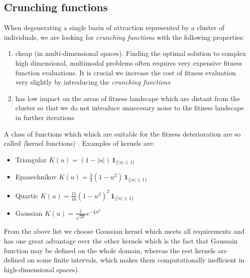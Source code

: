 \begin{algorithmic}[1]
	\ENDIF
\ENDWHILE
\end{algorithmic}

\subsection{Crunching functions}
When degenerating a single basin of attraction represented by a cluster of
individuals, we are looking for \textit{crunching functions} with the following
properties:

\begin{enumerate}
  \item cheap (in multi-dimensional spaces). Finding the optimal solution to
  complex high dimensional, multimodal problems often requires 
  very expensive fitness function evaluations. It is crucial we increase the
  cost of fitness evaluation very slightly by introducing the \textit{crunching
  functions}
  \item has low impact on the areas of fitness landscape which are distant from
  the cluster so that we do not introduce unnecesary noise to the fitness landscape
  in further iterations
\end{enumerate}

A class of functions which which are suitable for the fitness deterioration are
so called \textit(kernel functions) \cite{kernel}. Examples of kernels are: 
\begin{itemize}
  \item Triangular 	$K(u) = (1-|u|) \,\mathbf{1}_{\{|u|\leq1\}}$
  \item Epanechnikov 	$K(u) = \frac{3}{4}(1-u^2) \,\mathbf{1}_{\{|u|\leq1\}}$
  \item Quartic  $K(u) = \frac{15}{16}(1-u^2)^2 \,\mathbf{1}_{\{|u|\leq1\}}$
  \item Gaussian 	$K(u) = \frac{1}{\sqrt{2\pi}}e^{-\frac{1}{2}u^2}$
\end{itemize}

From the above list we choose Gaussian kernel which meets all requirements and 
has one great advantage over the other kernels which is the fact that
Gaussain function may be defined on the whole domain, whereas the rest
kernels are defined on some finite intervals, which makes them computationally
inefficient in high-dimensional spaces).

